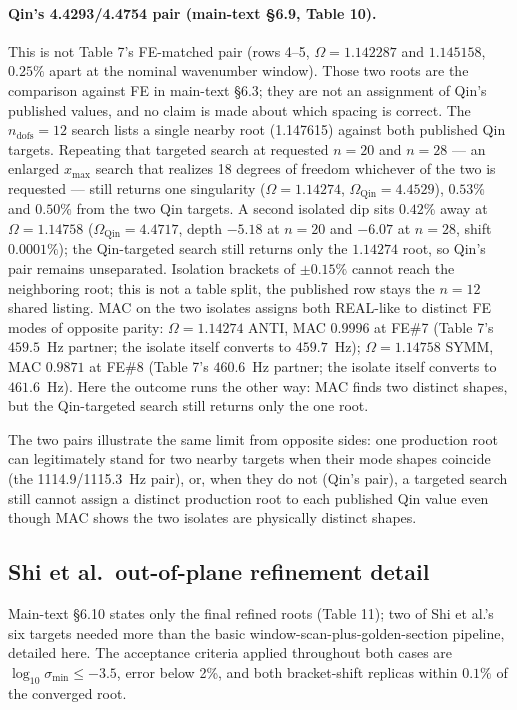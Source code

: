 \documentclass[11pt]{article}
\begin{document}
\paragraph{Qin's 4.4293/4.4754 pair (main-text \S6.9, Table 10).}
This is not Table 7's FE-matched pair (rows 4--5, $\Omega=1.142287$ and
$1.145158$, $0.25\%$ apart at the nominal wavenumber window). Those two
roots are the comparison against FE in main-text \S6.3; they are not an
assignment of Qin's published values, and no claim is made about which
spacing is correct. The $n_{\mathrm{dofs}}=12$ search lists a single
nearby root (1.147615) against both published Qin targets. Repeating
that targeted search at requested $n{=}20$ and $n{=}28$ --- an enlarged
$x_{\max}$ search that realizes 18 degrees of freedom whichever of the
two is requested --- still returns one singularity
($\Omega=1.14274$, $\Omega_{\mathrm{Qin}}=4.4529$), $0.53\%$ and
$0.50\%$ from the two Qin targets. A second isolated dip sits $0.42\%$ away
at $\Omega=1.14758$ ($\Omega_{\mathrm{Qin}}=4.4717$, depth $-5.18$ at
$n{=}20$ and $-6.07$ at $n{=}28$, shift $0.0001\%$); the Qin-targeted
search still returns only the $1.14274$ root, so Qin's pair remains
unseparated. Isolation brackets of $\pm0.15\%$ cannot reach the
neighboring root; this is not a table split, the published row stays
the $n{=}12$ shared listing. MAC on the two isolates assigns both
REAL-like to distinct FE modes of opposite parity: $\Omega=1.14274$
ANTI, MAC $0.9996$ at FE\#7 (Table 7's $459.5$~Hz partner; the isolate
itself converts to $459.7$~Hz); $\Omega=1.14758$ SYMM, MAC
$0.9871$ at FE\#8 (Table 7's $460.6$~Hz partner; the isolate itself
converts to $461.6$~Hz). Here the outcome runs the other way:
MAC finds two distinct shapes, but the Qin-targeted search still
returns only the one root.

The two pairs illustrate the same limit from opposite sides: one
production root can legitimately stand for two nearby targets when
their mode shapes coincide (the 1114.9/1115.3~Hz pair), or, when they do
not (Qin's pair), a targeted search still cannot assign a distinct
production root to each published Qin value even though MAC shows the
two isolates are physically distinct shapes.

\subsection{Shi et al.\ out-of-plane refinement detail}\label{sec:shi2014-detail}
Main-text \S6.10 states only the final refined roots
(Table 11); two of Shi et al.'s six targets needed
more than the basic window-scan-plus-golden-section pipeline, detailed
here. The acceptance criteria applied throughout both cases are
$\log_{10}\sigma_{\min}\le-3.5$, error below 2\%, and both bracket-shift
replicas within $0.1\%$ of the converged root.
\end{document}
